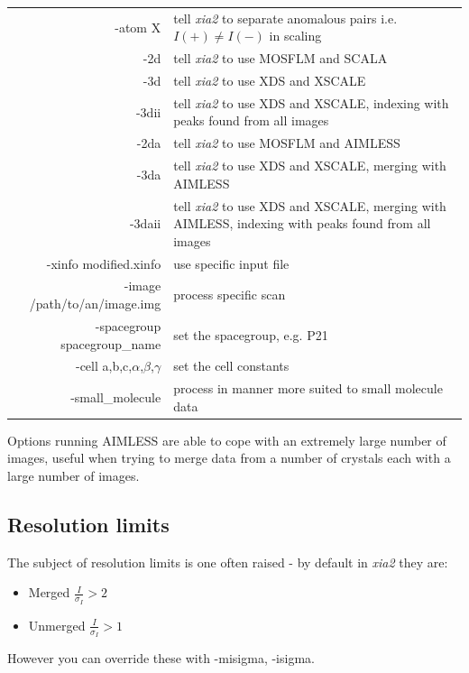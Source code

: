\documentclass[a4paper, 11pt]{article}
\begin{document}
\begin{center}
\begin{tabular}{|r|p{6cm}|}
\hline
-atom X & tell \emph{xia2} to separate anomalous pairs i.e. $I(+) \ne I(-)$ in 
scaling \\
-2d & tell \emph{xia2} to use MOSFLM and SCALA \\
-3d & tell \emph{xia2} to use XDS and XSCALE \\
-3dii & tell \emph{xia2} to use XDS and XSCALE, indexing with
    peaks found from all images \\
-2da & tell \emph{xia2} to use MOSFLM and AIMLESS \\
-3da & tell \emph{xia2} to use XDS and XSCALE, merging with AIMLESS \\
-3daii & tell \emph{xia2} to use XDS and XSCALE, merging with AIMLESS,
indexing with peaks found from all images \\
-xinfo modified.xinfo & use specific input file \\
-image /path/to/an/image.img & process specific scan \\
-spacegroup spacegroup\_name & set the spacegroup, e.g. P21 \\
-cell a,b,c,$\alpha$,$\beta$,$\gamma$ & set the cell constants \\ 
-small\_molecule & process in manner more suited to small molecule data \\
\hline
\end{tabular}
\end{center}

\noindent
Options running AIMLESS are able to cope with an extremely large
number of images, useful when trying to merge data from a number of
crystals each with a large number of images.

\subsection{Resolution limits}

The subject of resolution limits is one often raised - by default in
\emph{xia2} they are:

\begin{itemize}
\item{Merged $\frac{I}{\sigma_I} > 2$}
\item{Unmerged $\frac{I}{\sigma_I} > 1$}
\end{itemize}

\noindent
However you can override these with -misigma, -isigma.
\end{document}
